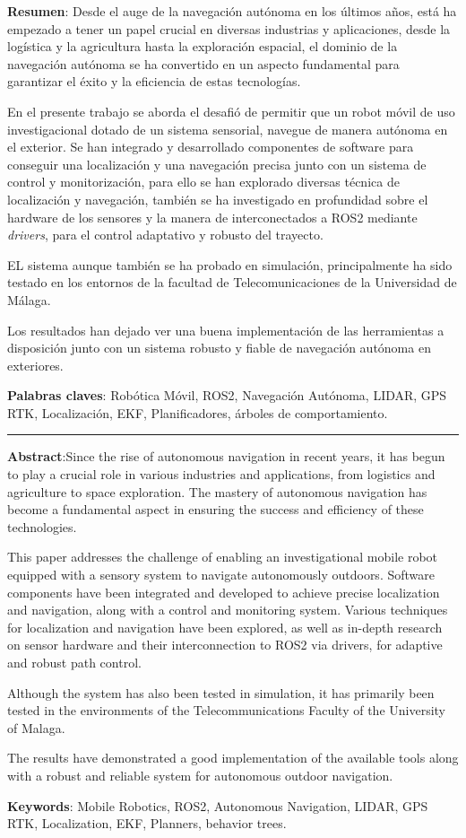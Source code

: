 \textbf{Resumen}:
Desde el auge de la navegación autónoma en los últimos años, está ha empezado a tener un papel crucial en diversas industrias y 
aplicaciones, desde la logística y la agricultura hasta la exploración espacial, el dominio de la navegación autónoma se ha convertido 
en un aspecto fundamental para garantizar el éxito y la eficiencia de estas tecnologías.

En el presente trabajo se aborda el desafió de permitir que un robot móvil de uso investigacional dotado de un sistema sensorial, 
navegue de manera autónoma en el exterior. 
Se han integrado y desarrollado componentes de software para conseguir una localización y una navegación precisa junto con un sistema de 
control y monitorización, para ello se han explorado diversas técnica de localización y navegación, también se ha investigado en profundidad 
sobre el hardware de los sensores y la manera de interconectados a ROS2 mediante \textit{drivers}, para el control adaptativo y robusto del trayecto.


EL sistema aunque también se ha probado en simulación, principalmente ha sido testado en los entornos de la facultad de Telecomunicaciones 
de la Universidad de Málaga.

Los resultados han dejado ver una buena implementación de las herramientas a disposición junto con un sistema robusto y fiable de navegación 
autónoma en exteriores.

\textbf{Palabras claves}: Robótica Móvil, ROS2, Navegación Autónoma, LIDAR, GPS RTK, Localización, EKF, Planificadores, árboles de comportamiento. 

\vspace{1cm}
\begin{center}
  \rule{0.5\textwidth}{.4pt}
\end{center}
\vspace{1cm}

\textbf{Abstract}:Since the rise of autonomous navigation in recent years, it has begun to play a crucial role in various industries and applications, from logistics and agriculture to space exploration. The mastery of autonomous navigation has become a fundamental aspect in ensuring the success and efficiency of these technologies.

This paper addresses the challenge of enabling an investigational mobile robot equipped with a sensory system to navigate autonomously outdoors. Software components have been integrated and developed to achieve precise localization and navigation, along with a control and monitoring system. Various techniques for localization and navigation have been explored, as well as in-depth research on sensor hardware and their interconnection to ROS2 via drivers, for adaptive and robust path control.

Although the system has also been tested in simulation, it has primarily been tested in the environments of the Telecommunications Faculty of the University of Malaga.

The results have demonstrated a good implementation of the available tools along with a robust and reliable system for autonomous outdoor navigation.

\textbf{Keywords}: Mobile Robotics, ROS2, Autonomous Navigation, LIDAR, GPS RTK, Localization, EKF, Planners, behavior trees.
